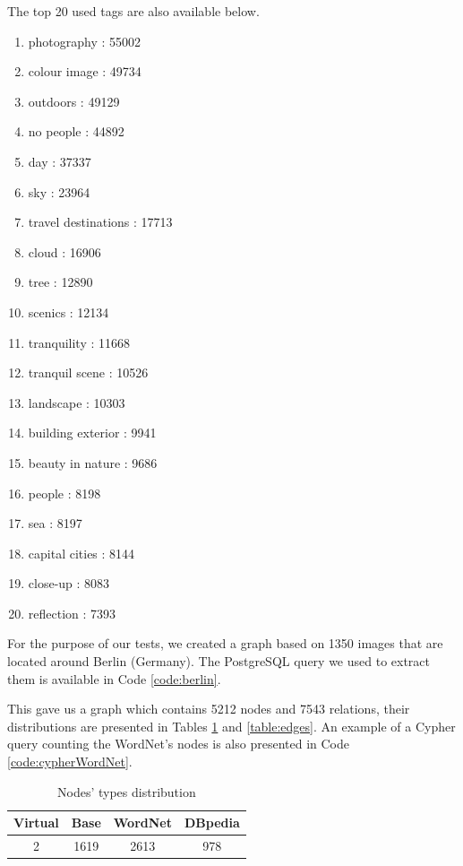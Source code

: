 The top 20 used tags are also available below.
\begin{multicols}{2}
\begin{enumerate}
  \item photography : 55002
  \item colour image : 49734
  \item outdoors : 49129
  \item no people : 44892
  \item day : 37337
  \item sky : 23964
  \item travel destinations : 17713
  \item cloud : 16906
  \item tree : 12890
  \item scenics : 12134
  \item tranquility : 11668
  \item tranquil scene : 10526
  \item landscape : 10303
  \item building exterior : 9941
  \item beauty in nature : 9686
  \item people : 8198
  \item sea : 8197
  \item capital cities : 8144
  \item close-up : 8083
  \item reflection : 7393
\end{enumerate}
\end{multicols}

For the purpose of our tests, we created a graph based on 1350 images that are located around Berlin (Germany). The PostgreSQL query we used to extract them is available in Code \ref{code:berlin}.


This gave us a graph which contains 5212 nodes and 7543 relations, their distributions are presented in Tables \ref{table:nodes} and \ref{table:edges}. An example of a Cypher query counting the WordNet's nodes is also presented in Code \ref{code:cypherWordNet}.\\

\begin{table}[!h]
\centering
\begin{tabular}{|c|c|c|c|}
\hline
{\bf Virtual} & {\bf Base} & {\bf WordNet} & {\bf DBpedia} \\ \hline
2             & 1619       & 2613          & 978           \\ \hline
\end{tabular}
\caption{Nodes' types distribution}
\label{table:nodes}
\end{table}

